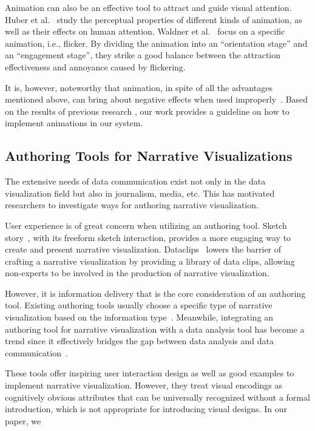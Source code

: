 Animation can also be an effective tool to attract and guide visual attention. Huber et al.~\cite{huber_visualizing_2005} study the perceptual properties of different kinds of animation, as well as their effects on human attention. Waldner et al.~\cite{waldner_attractive_2014} focus on a specific animation, i.e., flicker. By dividing the animation into an “orientation stage” and an “engagement stage”, they strike a good balance between the attraction effectiveness and annoyance caused by flickering. 

It is, however, noteworthy that animation, in spite of all the advantages mentioned above, can bring about negative effects when used improperly~\cite{robertson_effectiveness_2008}. Based on the results of previous research , our work provides a guideline on how to implement animations in our system.

\subsection{Authoring Tools for Narrative Visualizations}
The extensive needs of data communication exist not only in the data visualization field but also in journalism, media, etc. This has motivated researchers to investigate ways for authoring narrative visualization. 

User experience is of great concern when utilizing an authoring tool. Sketch story~\cite{lee_sketchstory:_2013}, with its freeform sketch interaction, provides a more engaging way to create and present narrative visualization. Dataclips~\cite{amini_authoring_2017} lowers the barrier of crafting a narrative visualization by providing a library of data clips, allowing non-experts to be involved in the production of narrative visualization. 

However, it is information delivery that is the core consideration of an authoring tool. Existing authoring tools usually choose a specific type of narrative visualization based on the information type~\cite{amini_authoring_2017, fulda_timelinecurator:_2016}. Meanwhile, integrating an authoring tool for narrative visualization with a  data analysis tool has become a trend since it effectively bridges the gap between data analysis and data communication~\cite{eccles_stories_2007, bryan_temporal_2016,lee_more_2015}. 
 
These tools offer inspiring user interaction design as well as good examples to implement narrative visualization. However, they treat visual encodings as cognitively obvious attributes that can be universally recognized without a formal introduction, which is not appropriate for introducing visual designs. In our paper, we   

